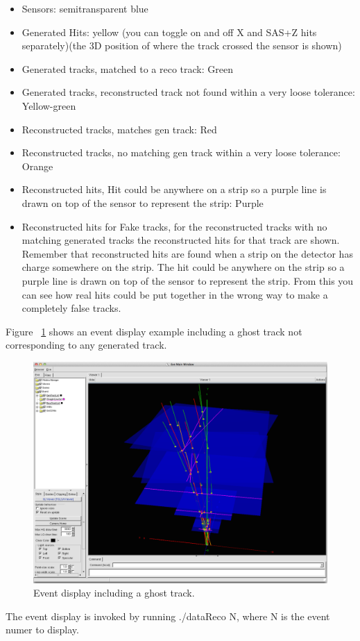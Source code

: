 \documentclass[aps,prd,superscriptaddress,floatfix]{revtex4}
\begin{document}
\begin{itemize}
\item Sensors: semitransparent blue

\item Generated Hits: yellow  (you can toggle on and off X and SAS+Z hits separately)(the 3D position of where the track crossed the sensor is shown)

\item Generated tracks, matched to a reco track: Green

\item Generated tracks, reconstructed track not found within a very loose tolerance: Yellow-green

\item Reconstructed tracks, matches gen track: Red

\item Reconstructed tracks, no matching gen track within a very loose tolerance: Orange

\item Reconstructed hits,  Hit could be anywhere on a strip so a purple line is drawn on top of the sensor to represent the strip: Purple

\item Reconstructed hits for Fake tracks, for the reconstructed tracks with no matching generated tracks the reconstructed hits for that track are shown.  Remember that reconstructed hits are found when a strip on the detector has charge somewhere on the strip.   The hit could be anywhere on the strip so a purple line is drawn on top of the sensor to represent the strip.  From this you can see how real hits could be put together in the wrong way to make a completely false tracks.   
\end{itemize}


Figure ~\ref{fig:eventdisplay} shows an event display example including
a ghost track not corresponding to any generated track.

\begin{figure}[hbtp]
  \begin{center}
    \includegraphics[width=17.0cm]{eventdisplay.png}
   \caption{Event display including a ghost track.}
    \label{fig:eventdisplay}
  \end{center}
\end{figure}

The event display is invoked by running ./dataReco N, where N is the
event numer to display.
\end{document}
